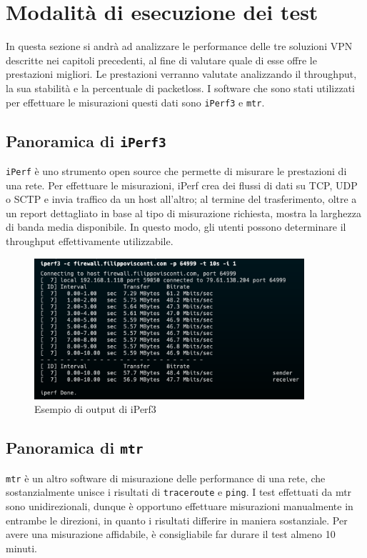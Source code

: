 \section{Modalità di esecuzione dei test}
In questa sezione si andrà ad analizzare le performance delle tre soluzioni VPN descritte nei capitoli precedenti, al fine di valutare quale di esse offre le prestazioni migliori.
Le prestazioni verranno valutate analizzando il throughput, la sua stabilità e la percentuale di packetloss.
I software che sono stati utilizzati per effettuare le misurazioni questi dati sono \texttt{iPerf3} e \texttt{mtr}.

\subsection{Panoramica di \texttt{iPerf3}}
\texttt{iPerf} è uno strumento open source che permette di misurare le prestazioni di una rete.
Per effettuare le misurazioni, iPerf crea dei flussi di dati su TCP, UDP o SCTP \cite[RFC4960]{RFC4960} e invia traffico da un host all'altro; al termine del trasferimento, oltre a un report dettagliato in base al tipo di misurazione richiesta, mostra la larghezza di banda media disponibile.
In questo modo, gli utenti possono determinare il throughput effettivamente utilizzabile.

\begin{figure}[ht]
    \centering
    \includegraphics[width=10cm]{figure/iperfSample.png}
    \caption{Esempio di output di iPerf3}
\end{figure}

\subsection{Panoramica di \texttt{mtr}}
\texttt{mtr} è un altro software di misurazione delle performance di una rete, che sostanzialmente unisce i risultati di \texttt{traceroute} e \texttt{ping}.
I test effettuati da mtr sono unidirezionali, dunque è opportuno effettuare misurazioni manualmente in entrambe le direzioni, in quanto i risultati differire in maniera sostanziale. Per avere una misurazione affidabile, è consigliabile far durare il test almeno 10 minuti.

